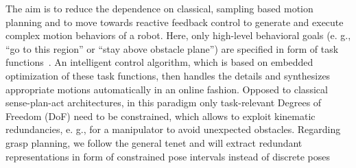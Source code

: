 The aim is to reduce the dependence on classical, sampling based motion planning and to move towards
reactive feedback control to generate and execute complex motion behaviors of a robot.  Here, only
high-level behavioral goals (e. g., “go to this region” or “stay above obstacle plane”) are
specified in form of task functions~\cite{Sams91}. An intelligent control algorithm, which is based
on embedded optimization of these task functions, then handles the details and synthesizes
appropriate motions automatically in an online fashion. Opposed to classical sense-plan-act
architectures, in this paradigm only task-relevant Degrees of Freedom (DoF) need to be constrained,
which allows to exploit kinematic redundancies, e. g., for a manipulator to avoid unexpected
obstacles. Regarding grasp planning, we follow the general tenet and will extract redundant
representations in form of constrained pose intervals instead of discrete poses
%
